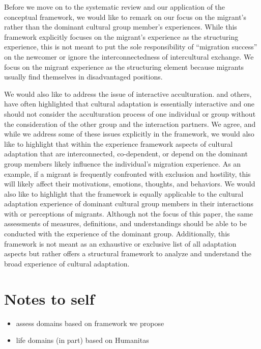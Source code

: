 \documentclass[man, 12pt, a4paper]{apa7}
\begin{document}
Before we move on to the systematic review and our application of the conceptual framework, we would like to remark on our focus on the migrant's rather than the dominant cultural group member's experiences. 
While this framework explicitly focuses on the migrant's experience as the structuring experience, this is not meant to put the sole responsibility of ``migration success'' on the newcomer or ignore the interconnectedness of intercultural exchange. We focus on the migrant experience as the structuring element because migrants usually find themselves in disadvantaged positions. 

We would also like to address the issue of interactive acculturation. \citet{Bourhis1997a} and others, have often highlighted that cultural adaptation is essentially interactive and one should not consider the acculturation process of one individual or group without the consideration of the other group and the interaction partners. We agree, and while we address some of these issues explicitly in the framework, we would also like to highlight that within the experience framework aspects of cultural adaptation that are interconnected, co-dependent, or depend on the dominant group members likely influence the individual's migration experience. As an example, if a migrant is frequently confronted with exclusion and hostility, this will likely affect their motivations, emotions, thoughts, and behaviors. 
We would also like to highlight that the framework is equally applicable to the cultural adaptation experience of dominant cultural group members in their interactions with or perceptions of migrants. Although not the focus of this paper, the same assessments of measures, definitions, and understandings should be able to be conducted with the experience of the dominant group.
Additionally, this framework is not meant as an exhaustive or exclusive list of all adaptation aspects but rather offers a structural framework to analyze and understand the broad experience of cultural adaptation.

\section{Notes to self}
\begin{itemize}
  \item assess domains based on framework we propose
  \item life domains (in part) based on Humanitas
\end{itemize}
\end{document}

